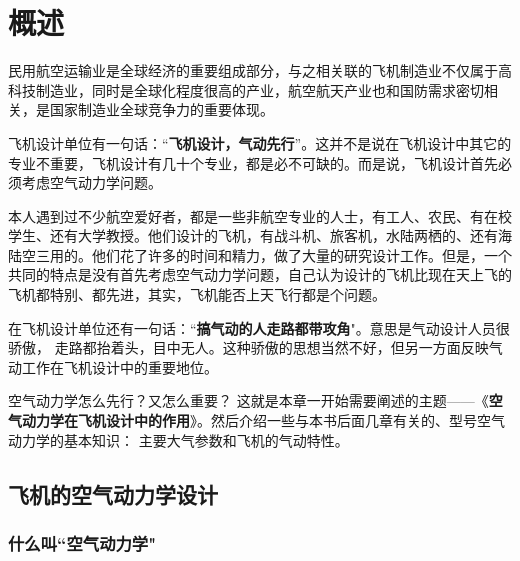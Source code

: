 \chapter{概述}\label{ch1}



民用航空运输业是全球经济的重要组成部分，与之相关联的飞机制造业不仅属于高科技制造业，同时是全球化程度很高的产业，航空航天产业也和国防需求密切相关，是国家制造业全球竞争力的重要体现。

飞机设计单位有一句话：“{\textbf{飞机设计，气动先行}}”。这并不是说在飞机设计中其它的专业不重要，飞机设计有几十个专业，都是必不可缺的。而是说，飞机设计首先必须考虑空气动力学问题。

本人遇到过不少航空爱好者，都是一些非航空专业的人士，有工人、农民、有在校学生、还有大学教授。他们设计的飞机，有战斗机、旅客机，水陆两栖的、还有海陆空三用的。他们花了许多的时间和精力，做了大量的研究设计工作。但是，一个共同的特点是没有首先考虑空气动力学问题，自己认为设计的飞机比现在天上飞的飞机都特别、都先进，其实，飞机能否上天飞行都是个问题。

在飞机设计单位还有一句话：``{\textbf{搞气动的人走路都带攻角}}"。意思是气动设计人员很骄傲， 走路都抬着头，目中无人。这种骄傲的思想当然不好，但另一方面反映气动工作在飞机设计中的重要地位。

空气动力学怎么先行？又怎么重要？ 这就是本章一开始需要阐述的主题——《{\textbf{空气动力学在飞机设计中的作用}}》。然后介绍一些与本书后面几章有关的、型号空气动力学的基本知识： 主要大气参数和飞机的气动特性。

\section{飞机的空气动力学设计}
\subsection{什么叫``空气动力学"}

